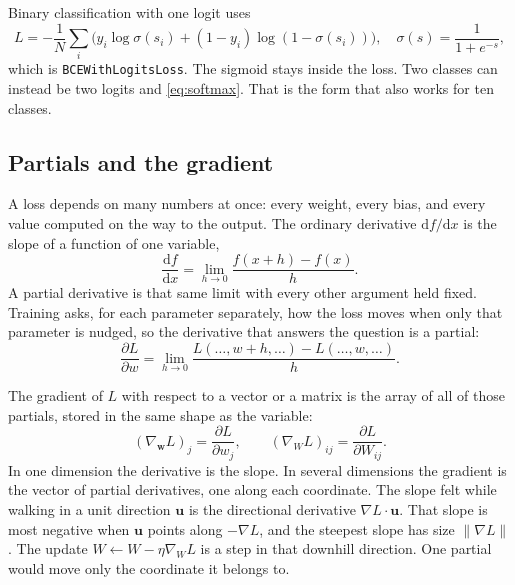 \documentclass[11pt]{article}
\begin{document}
Binary classification with one logit uses
\begin{equation}
L=-\frac{1}{N}\sum_i\Big(y_i\log\sigma(s_i)+(1-y_i)\log(1-\sigma(s_i))\Big),
\quad
\sigma(s)=\frac{1}{1+e^{-s}},
\end{equation}
which is \texttt{BCEWithLogitsLoss}. The sigmoid stays inside the loss. Two classes can instead be two logits and \eqref{eq:softmax}. That is the form that also works for ten classes.

\subsection{Partials and the gradient}

A loss depends on many numbers at once: every weight, every bias, and every value computed on the way to the output. The ordinary derivative $\mathrm{d}f/\mathrm{d}x$ is the slope of a function of one variable,
\begin{equation}
\frac{\mathrm{d}f}{\mathrm{d}x}
=
\lim_{h\to 0}\frac{f(x+h)-f(x)}{h}.
\end{equation}
A partial derivative is that same limit with every other argument held fixed. Training asks, for each parameter separately, how the loss moves when only that parameter is nudged, so the derivative that answers the question is a partial:
\begin{equation}
\frac{\partial L}{\partial w}
=
\lim_{h\to 0}
\frac{L(\ldots,w+h,\ldots)-L(\ldots,w,\ldots)}{h}.
\end{equation}

The gradient of $L$ with respect to a vector or a matrix is the array of all of those partials, stored in the same shape as the variable:
\begin{equation}
(\nabla_{\mathbf{w}} L)_j=\frac{\partial L}{\partial w_j},
\qquad
(\nabla_W L)_{ij}=\frac{\partial L}{\partial W_{ij}}.
\end{equation}
In one dimension the derivative is the slope. In several dimensions the gradient is the vector of partial derivatives, one along each coordinate. The slope felt while walking in a unit direction $\mathbf{u}$ is the directional derivative $\nabla L\cdot\mathbf{u}$. That slope is most negative when $\mathbf{u}$ points along $-\nabla L$, and the steepest slope has size $\|\nabla L\|$. The update $W\leftarrow W-\eta\nabla_W L$ is a step in that downhill direction. One partial would move only the coordinate it belongs to.
\end{document}
